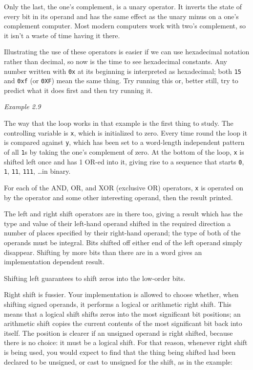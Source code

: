     Only the last, the one's complement, is a unary operator. It inverts
     the state of every bit in its operand and has the same effect as the
     unary minus on a one's complement computer. Most modern computers work
     with two's complement, so it isn't a waste of time having it there.


    Illustrating the use of these operators is easier if we can use
     hexadecimal notation rather than decimal, so now is the time to see
     hexadecimal constants. Any number written with \texttt{0x} at
     its beginning is interpreted as hexadecimal; both \texttt{15}
     and \texttt{0xf} (or \texttt{0XF}) mean the same thing.
     Try running this or, better still, try to predict what it does first and
     then try running it.


     \begin{center}\textit{Example 2.9}\end{center}


    The way that the loop works in that example is the first thing to
     study. The controlling variable is \texttt{x}, which is
     initialized to zero. Every time round the loop it is compared
     against \texttt{y}, which has been set to a word-length
     independent pattern of all \texttt{1}s by taking the one's
     complement of zero. At the bottom of the loop, \texttt{x} is
     shifted left once and has 1 OR-ed into it, giving rise to a sequence
     that starts \texttt{0}, \texttt{1}, \texttt{11},
     \texttt{111}, \ldots  in binary.


    For each of the AND, OR, and XOR (exclusive OR) operators,
     \texttt{x} is operated on by the operator and some other
     interesting operand, then the result printed.


    The left and right shift operators are in there too, giving a result
     which has the type and value of their left-hand operand shifted in the
     required direction a number of places specified by their right-hand
     operand; the type of both of the operands must be integral. Bits shifted
     off either end of the left operand simply disappear. Shifting by more
     bits than there are in a word gives an implementation dependent
     result.


    Shifting left guarantees to shift zeros into the low-order bits.


    Right shift is fussier. Your implementation is allowed to choose
     whether, when shifting signed operands, it performs a logical or
     arithmetic right shift. This means that a logical shift shifts zeros into
     the most significant bit positions; an arithmetic shift copies the
     current contents of the most significant bit back into itself. The
     position is clearer if an unsigned operand is right shifted, because
     there is no choice: it must be a logical shift. For that reason, whenever
     right shift is being used, you would expect to find that the thing being
     shifted had been declared to be unsigned, or cast to unsigned for the
     shift, as in the example:


